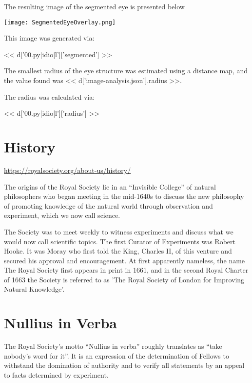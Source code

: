\documentclass{article}
\begin{document}
The resulting image of the segmented eye is presented below

\texttt{[image: SegmentedEyeOverlay.png]}

This image was generated via:

<< d['00.py|idio|l']['segmented'] >>

The smallest radius of the eye structure was estimated using a distance map,
and the value found was << d['image-analysis.json'].radius >>.

The radius was calculated via:

<< d['00.py|idio|l']['radius'] >>

\section{History}

\url{https://royalsociety.org/about-us/history/}

The origins of the Royal Society lie in an ``Invisible College'' of natural
philosophers who began meeting in the mid-1640s to discuss the new philosophy
of promoting knowledge of the natural world through observation and experiment,
which we now call science.

The Society was to meet weekly to witness experiments and discuss what we would
now call scientific topics. The first Curator of Experiments was Robert Hooke.
It was Moray who first told the King, Charles II, of this venture and secured
his approval and encouragement. At first apparently nameless, the name The
Royal Society first appears in print in 1661, and in the second Royal Charter
of 1663 the Society is referred to as 'The Royal Society of London for
Improving Natural Knowledge'.

\section{Nullius in Verba}

The Royal Society's motto ``Nullius in verba'' roughly translates as ``take
nobody's word for it''. It is an expression of the determination of Fellows to
withstand the domination of authority and to verify all statements by an appeal
to facts determined by experiment.
\end{document}
